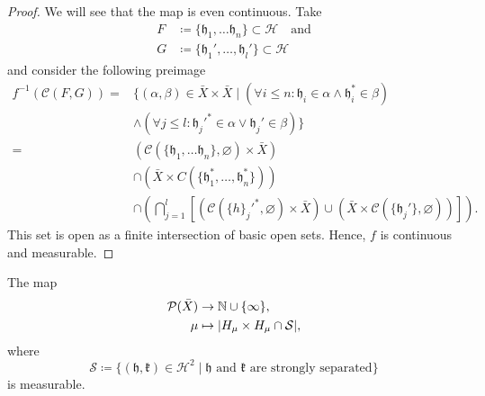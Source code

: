 \begin{proof}
  We will see that the map is even continuous. Take
  \begin{align*}
    F & \coloneqq \{\mathfrak{h}_1,\dots \mathfrak{h}_n\} \subset \mathcal{H} \quad \text{and}\\
    G & \coloneqq \{\mathfrak{h}_1', \dots, \mathfrak{h}_l'\} \subset \mathcal{H}
  \end{align*}
  and consider the following preimage
  \begin{align*}
    f^{-1}(\mathcal{C}(F, G))  = & \{(\alpha, \beta) \in \bar X \times \bar X \mid (\forall i \leq n\colon \mathfrak{h}_i \in \alpha \wedge \mathfrak{h}_i^\ast \in \beta)\\
    & \wedge (\forall j \leq l \colon \mathfrak{h}_j'^\ast \in \alpha \vee \mathfrak{h}_j' \in \beta)\}\\
    = & (\mathcal{C}(\{\mathfrak{h}_1, \dots \mathfrak{h}_n\}, \varnothing)  \times \bar X)\\
    & \cap (\bar X \times C(\{\mathfrak{h}_1^\ast, \dots, \mathfrak{h}_n^\ast\}))\\
                                                                                                                  & \cap \left ( \bigcap_{j=1}^l \left[(\mathcal{C}(\{h\}_j'^\ast, \varnothing) \times \bar X) \cup (\bar X \times \mathcal{C}(\{\mathfrak{h}_j'\}, \varnothing))\right]\right).
  \end{align*}
  This set is open as a finite intersection of basic open sets. Hence, \(f\) is continuous and measurable.
\end{proof}

\begin{lemma}
  \label{lem:measurable-str-sep}
  The map
  \begin{align*}
    \mathcal{P}(\bar X) & \to \mathbb{N} \cup \{\infty\},\\
    \mu & \mapsto |H_\mu\times H_\mu \cap \mathcal{S}|,
  \end{align*}
  where
  \[
    \mathcal{S}\coloneqq \{(\mathfrak{h},\mathfrak{k}) \in \mathcal{H}^2 \mid \mathfrak{h} \text{ and } \mathfrak{k} \text{ are strongly separated}\}
  \]
  is measurable.
\end{lemma}


